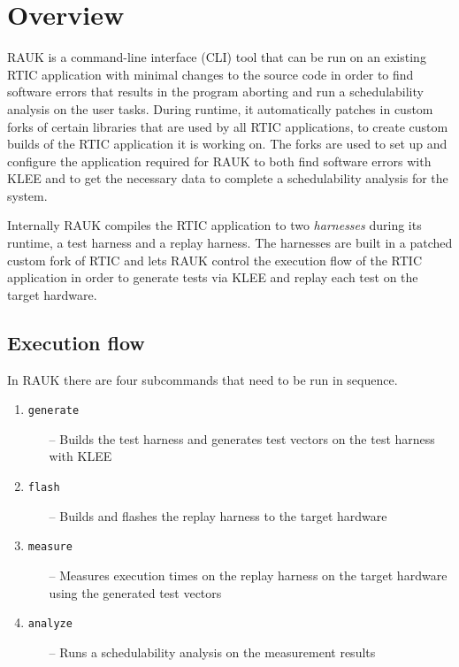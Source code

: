 \section{Overview}
RAUK is a command-line interface (CLI) tool that can be run on an existing
RTIC application with minimal changes to the source code in order to find software 
errors that results in the program aborting and run a
schedulability analysis on the user tasks. During runtime, it automatically
patches in custom forks of certain libraries that are used by all RTIC
applications, to create custom builds of the RTIC application it is working on.
The forks are used to set up and configure the application required for RAUK to both
find software errors with KLEE and to get the necessary data to complete a 
schedulability analysis for the system.

Internally RAUK compiles the RTIC application to two \emph{harnesses} during
its runtime, a test harness and a replay harness. The harnesses are built in a
patched custom fork of RTIC and lets RAUK control the execution flow of the
RTIC application in order to generate tests via KLEE and replay each test on
the target hardware.

\subsection{Execution flow}
In RAUK there are four subcommands that need to be run in sequence.

\begin{enumerate}
    \item \texttt{generate}
    \begin{itemize}
        \item [--] Builds the test harness and generates test vectors on the test
            harness with KLEE
    \end{itemize}
    \item \texttt{flash}
    \begin{itemize}
        \item [--] Builds and flashes the replay harness to the target hardware
    \end{itemize}
    \item \texttt{measure}
    \begin{itemize}
        \item [--] Measures execution times on the replay harness on the target
            hardware using the generated test vectors
    \end{itemize}
    \item \texttt{analyze}
    \begin{itemize}
        \item [--] Runs a schedulability analysis on the measurement results
    \end{itemize}
\end{enumerate}

